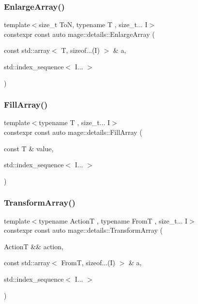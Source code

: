 \subsubsection{\texorpdfstring{Enlarge\+Array()}{EnlargeArray()}}
{\footnotesize\ttfamily template$<$size\+\_\+t ToN, typename T , size\+\_\+t... I$>$ \\
constexpr const auto mage\+::details\+::\+Enlarge\+Array (\begin{DoxyParamCaption}\item[{const std\+::array$<$ T, sizeof...(I) $>$ \&}]{a,  }\item[{std\+::index\+\_\+sequence$<$ I... $>$}]{ }\end{DoxyParamCaption})}

\mbox{\label{namespacemage_1_1details_ae5b148b74b882be8b1afd09832808a67}} 
\subsubsection{\texorpdfstring{Fill\+Array()}{FillArray()}}
{\footnotesize\ttfamily template$<$typename T , size\+\_\+t... I$>$ \\
constexpr const auto mage\+::details\+::\+Fill\+Array (\begin{DoxyParamCaption}\item[{const T \&}]{value,  }\item[{std\+::index\+\_\+sequence$<$ I... $>$}]{ }\end{DoxyParamCaption})}

\mbox{\label{namespacemage_1_1details_a597d1869ab9d86b34b67dc7d941dc5e5}} 
\subsubsection{\texorpdfstring{Transform\+Array()}{TransformArray()}}
{\footnotesize\ttfamily template$<$typename ActionT , typename FromT , size\+\_\+t... I$>$ \\
constexpr const auto mage\+::details\+::\+Transform\+Array (\begin{DoxyParamCaption}\item[{ActionT \&\&}]{action,  }\item[{const std\+::array$<$ FromT, sizeof...(I) $>$ \&}]{a,  }\item[{std\+::index\+\_\+sequence$<$ I... $>$}]{ }\end{DoxyParamCaption})}

